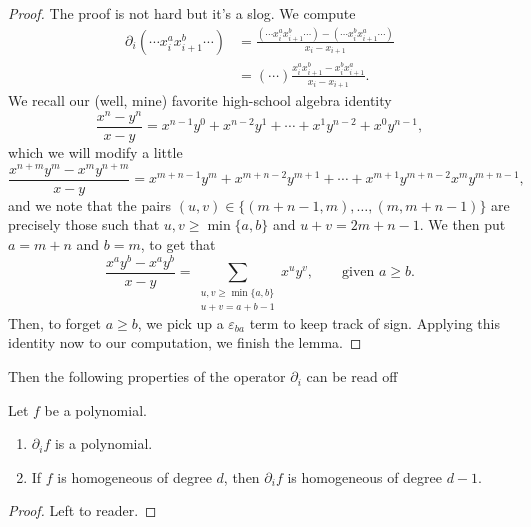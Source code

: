 \documentclass{article}
\begin{document}
\begin{proof}
    The proof is not hard but it's a slog. We compute
    \begin{align*}
        \partial_i(\cdots x_i^a x_{i+1}^b \cdots) &= \frac{(\cdots x_i^a x_{i+1}^b \cdots) - (\cdots x_i^b x_{i+1}^a \cdots)}{x_i-x_{i+1}} \\
                                                                          &= (\cdots) \frac{x_i^ax_{i+1}^b - x_i^bx_{i+1}^a}{x_i-x_{i+1}}.
    \end{align*}
    We recall our (well, mine) favorite high-school algebra identity
    \[
        \frac{x^n-y^n}{x-y} = x^{n-1}y^0 + x^{n-2}y^1 + \cdots + x^1y^{n-2} + x^0y^{n-1},
    \]
    which we will modify a little
    \[
        \frac{x^{n+m}y^m-x^my^{n+m}}{x-y} = x^{m+n-1}y^m + x^{m+n-2}y^{m+1} + \cdots + x^{m+1}y^{m+n-2}x^my^{m+n-1},
    \]
    and we note that the pairs $(u,v) \in \{(m+n-1,m),\ldots,(m,m+n-1)\}$ are precisely those such that $u,v \geq \min\{a,b\}$ and $u+v = 2m+n-1$. We then put $a=m+n$ and $b=m$, to get that
    \[
        \frac{x^ay^b-x^ay^b}{x-y} = \sum_{\substack{u,v \geq \min\{a,b\}\\u+v=a+b-1}} x^uy^v, \qquad \text{given }a \geq b.
    \]
    Then, to forget $a \geq b$, we pick up a $\varepsilon_{ba}$ term to keep track of sign. 
    Applying this identity now to our computation, we finish the lemma.
\end{proof}

Then the following properties of the operator $\partial_i$ can be read off

\begin{corollary} 
    Let $f$ be a polynomial.
    \begin{enumerate}[label=(\alph*)]
        \item $\partial_if$ is a polynomial.
        \item If $f$ is homogeneous of degree $d$, then $\partial_if$ is homogeneous of degree $d-1$.
    \end{enumerate}
\end{corollary}

\begin{proof}
    Left to reader.
\end{proof}
\end{document}
